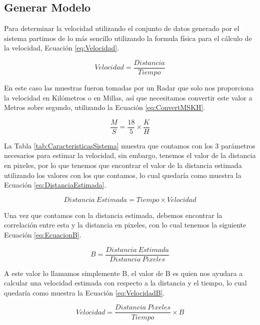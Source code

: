 \subsection{Generar Modelo}
\label{cap:GenerarModelo}

Para determinar la velocidad utilizando el conjunto de datos generado por el sistema partimos de lo más sencillo utilizando la formula física para el cálculo de la velocidad, Ecuación \ref{eq:Velocidad}.

\begin{equation}
    \label{eq:Velocidad}
    Velocidad = \frac{Distancia}{Tiempo}
\end{equation}

En este caso las muestras fueron tomadas por un Radar que solo nos proporciona la velocidad en Kilómetros o en Millas, así que necesitamos convertir este valor a Metros sobre segundo, utilizando la Ecuación \ref{eq:ConvertMSKH}.

\begin{equation}
    \label{eq:ConvertMSKH}
    \frac{M}{S} = \frac{18}{5} \times \frac{K}{H}
\end{equation}

La Tabla \ref{tab:CaracteristicasSistema} muestra que contamos con los 3 parámetros necesarios para estimar la velocidad, sin embargo, tenemos el valor de la distancia en pixeles, por lo que tenemos que encontrar el valor de la distancia estimada utilizando los valores con los que contamos, lo cual quedaría como muestra la Ecuación \ref{eq:DistanciaEstimada}.

\begin{equation}
    \label{eq:DistanciaEstimada}
    Distancia\:Estimada = Tiempo \times Velocidad
\end{equation}

Una vez que contamos con la distancia estimada, debemos encontrar la correlación entre esta y la distancia en pixeles, con lo cual tenemos la siguiente Ecuación \ref{eq:EcuacionB}.

\begin{equation}
    \label{eq:EcuacionB}
    B = \frac{Distancia \: Estimada}{Distancia \: Pixeles}
\end{equation}

A este valor lo llamamos simplemente B, el valor de B es quien nos ayudara a calcular una velocidad estimada con respecto a la distancia y el tiempo, lo cual quedaría como muestra la Ecuación \ref{eq:VelocidadB}.

\begin{equation}
    \label{eq:VelocidadB}
    Velocidad = \frac{Distancia \: Pixeles}{Tiempo} \times B
\end{equation}

